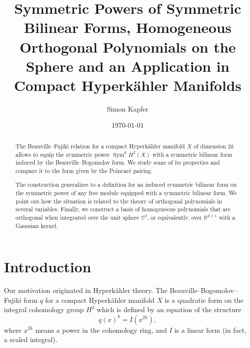 \documentclass{amsart}
\DeclareMathOperator{\Sym}{Sym}
\newcommand{\R}{\mathbb{R}}
\renewcommand{\S}{\mathbb{S}}
\theoremstyle{plain}
\theoremstyle{definition}
\theoremstyle{remark}
\begin{document}
\title[Symmetric Powers, Hom.~Orth.~Polynomials, Hyperk\"ahlers]{Symmetric Powers of Symmetric Bilinear Forms, Homogeneous Orthogonal Polynomials on the Sphere and an Application in Compact Hyperk\"ahler Manifolds}


\author{Simon Kapfer}
\address{Simon Kapfer, Laboratoire de Math\'ematiques et Applications, UMR CNRS 6086, Universit\'e de Poitiers, T\'el\'eport 2, Boulevard Marie et Pierre Curie, F-86962 Futuroscope Chasseneuil}


\date{\today}


\begin{abstract} The Beauville--Fujiki relation for a compact Hyperk\"ahler manifold $X$ of dimension $2k$ allows to equip the symmetric power $\Sym^kH^2(X)$ with a symmetric bilinear form induced by the Beauville--Bogomolov form. We study some of its properties and compare it to the form given by the Poincar\'e pairing.

The construction generalizes to a definition for an induced symmetric bilinear form on the symmetric power of any free module equipped with a symmetric bilinear form. We point out how the situation is related to the theory of orthogonal polynomials in several variables.
Finally, we construct a basis of homogeneous polynomials that are orthogonal when integrated over the unit sphere $\S^d$, or equivalently, over $\R^{d+1}$ with a Gaussian kernel.
\end{abstract}

\maketitle


\section{Introduction}
Our motivation originated in Hyperk\"ahler theory. The Beauville--Bogomolov--Fujiki form $q$ for a compact Hyperk\"ahler manifold $X$ is a quadratic form on the integral cohomology group $H^2$ which is defined by an equation of the structure
\begin{equation} \label{initialeq}
q(x)^k = I(x^{2k}),
\end{equation}
where $x^{2k}$ means a power in the cohomology ring, and $I$ is a linear form (in fact, a scaled integral). 
\end{document}
